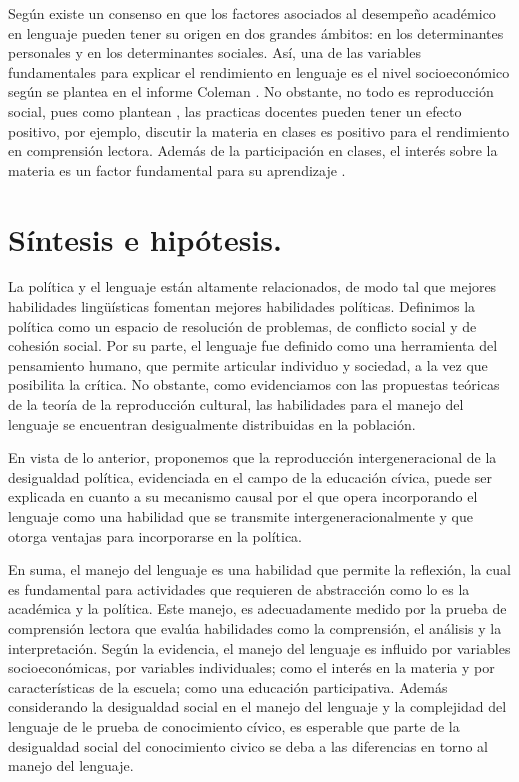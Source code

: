 \documentclass[12pt,twoside]{templates/facsothesis}
\begin{document}
Según \citet{barahonau_Factores_2014} existe un consenso en que los factores asociados al desempeño académico en lenguaje pueden tener su origen en dos grandes ámbitos: en los determinantes personales y en los determinantes sociales. Así, una de las variables fundamentales para explicar el rendimiento en lenguaje es el nivel socioeconómico según se plantea en el informe Coleman \citep{marques_Apuntes_2016}. No obstante, no todo es reproducción social, pues como plantean \citet{lara_mirada_2010}, las practicas docentes pueden tener un efecto positivo, por ejemplo, discutir la materia en clases es positivo para el rendimiento en comprensión lectora. Además de la participación en clases, el interés sobre la materia es un factor fundamental para su aprendizaje \citep{lozano_Relacion_2000}.

\hypertarget{suxedntesis-e-hipuxf3tesis.}{%
\section{Síntesis e hipótesis.}\label{suxedntesis-e-hipuxf3tesis.}}

La política y el lenguaje están altamente relacionados, de modo tal que mejores habilidades lingüísticas fomentan mejores habilidades políticas. Definimos la política como un espacio de resolución de problemas, de conflicto social y de cohesión social. Por su parte, el lenguaje fue definido como una herramienta del pensamiento humano, que permite articular individuo y sociedad, a la vez que posibilita la crítica. No obstante, como evidenciamos con las propuestas teóricas de la teoría de la reproducción cultural, las habilidades para el manejo del lenguaje se encuentran desigualmente distribuidas en la población.

En vista de lo anterior, proponemos que la reproducción intergeneracional de la desigualdad política, evidenciada en el campo de la educación cívica, puede ser explicada en cuanto a su mecanismo causal por el que opera incorporando el lenguaje como una habilidad que se transmite intergeneracionalmente y que otorga ventajas para incorporarse en la política.

En suma, el manejo del lenguaje es una habilidad que permite la reflexión, la cual es fundamental para actividades que requieren de abstracción como lo es la académica y la política. Este manejo, es adecuadamente medido por la prueba de comprensión lectora que evalúa habilidades como la comprensión, el análisis y la interpretación. Según la evidencia, el manejo del lenguaje es influido por variables socioeconómicas, por variables individuales; como el interés en la materia y por características de la escuela; como una educación participativa. Además considerando la desigualdad social en el manejo del lenguaje y la complejidad del lenguaje de le prueba de conocimiento cívico, es esperable que parte de la desigualdad social del conocimiento civico se deba a las diferencias en torno al manejo del lenguaje.
\end{document}
